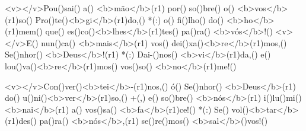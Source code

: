 <v></v>Pou()sai() a() <b>mão</b>(r1) por() so()bre() o() <b>vos</b>(r1)so() Pro()te()<b>gi</b>(r1)do,() *(:)
o() fi()lho() do() <b>ho</b>(r1)mem() que() es()co()<b>lhes</b>(r1)tes() pa()ra() <b>vós</b>!()
<v></v>E() nun()ca() <b>mais</b>(r1) vos() dei()xa()<b>re</b>(r1)mos,() Se()nhor() <b>Deus</b>!(r1) *(:)
Dai-()nos() <b>vi</b>(r1)da,() e() lou()va()<b>re</b>(r1)mos() vos()so() <b>no</b>(r1)me!()

<v></v>Con()ver()<b>tei</b>-(r1)nos,() ó() Se()nhor() <b>Deus</b>(r1) do() u()ni()<b>ver</b>(r1)so,() +(,)
e() so()bre() <b>nós</b>(r1) i()lu()mi()<b>nai</b>(r1) a() vos()sa() <b>fa</b>(r1)ce!() *(:)
Se() vol()<b>tar</b>(r1)des() pa()ra() <b>nós</b>,(r1) se()re()mos() <b>sal</b>()vos!()